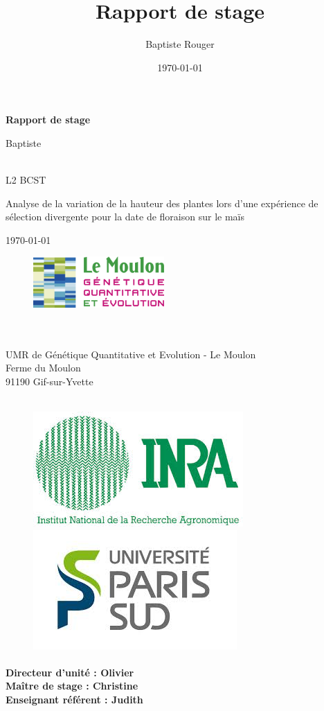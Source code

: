 \documentclass[12pt,a4paper]{article}
\author{Baptiste Rouger}
\title{Rapport de stage}
\date{\today}
\begin{document}
	\begin{titlepage}
		
		\begin{center}
			\vfill
			
			{\Huge \textbf{Rapport de stage}}
			
			\vfill
			
			{\LARGE Baptiste }
			
			~\\L2 BCST
			
			\vfill
			
			{\Huge Analyse de la variation de la hauteur des plantes lors d'une expérience de sélection divergente pour la date de floraison sur le maïs}
			
			\vfill
			
			{\large\today}
			
			\vfill
			\end{center}
			
			\begin{figure}
				\includegraphics[width=5cm]{logo.jpg}
			\end{figure} ~\\ ~\\
			UMR de Génétique Quantitative et Evolution - Le Moulon\\
			Ferme du Moulon\\
			91190 Gif-sur-Yvette \\ \\
			
			\begin{figure}[h]
				\centering
				\includegraphics[width = 4 cm]{inra.jpg}
				\includegraphics[width = 4 cm]{upsud.jpg}
			\end{figure}
			
			\paragraph*{Directeur d'unité : Olivier  \\
			Maître de stage : Christine \\
			Enseignant référent : Judith  }
			\vfill
	\end{titlepage}
\end{document}
